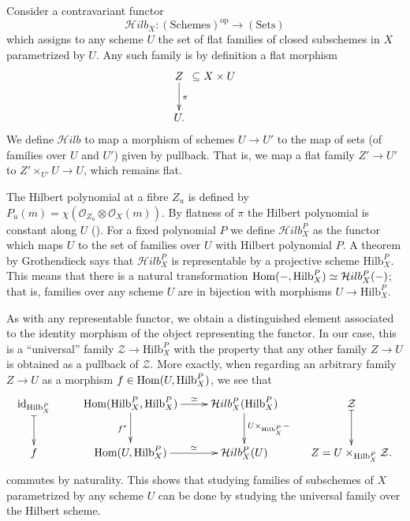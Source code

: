\medskip\noindent
Consider a contravariant functor 
$$
\mathcal{H}ilb_X:(\text{Schemes})^{\text{op}}\to (\text{Sets})
$$
which assigns to any scheme $U$ the set of flat families
of closed subschemes in $X$ parametrized by $U$.
Any such family is by definition a flat morphism
$$
\xymatrixcolsep{.1em}
\xymatrix{
Z \ar[d]^\pi&\subseteq X \times U\\
U.
}
$$
We define $\mathcal{H}ilb$ to map a morphism of schemes
$U \to U'$ to the map of sets (of families over $U$ and $U'$) given
by pullback. That is, we map a flat family $Z'\to U'$ 
to $Z'\times_{U'}U \to U$, which remains flat.

The Hilbert polynomial at a fibre $Z_u$ is defined by
$P_u(m)=\chi(\mathcal{O}_{Z_u}\otimes \mathcal{O}_X(m))$.
By flatness of $\pi$ the Hilbert polynomial is constant along $U$
(\cite[Part III, Theorem 9.9]{Hartshorne}).
For a fixed polynomial $P$
we define $\mathcal{H}ilb^P_X$ as the functor which maps $U$ 
to the set of families over $U$ with Hilbert polynomial $P$.
A theorem by Grothendieck says that $\mathcal{H}ilb^P_X$ is representable
by a projective scheme $\text{Hilb}^P_X$.
This means that there is a natural transformation
$\mathop{\mathrm{Hom}}\nolimits(-,\text{Hilb}^P_X) \simeq \mathcal{H}ilb^P_X(-)$;
that is, families over any scheme $U$ are in bijection with
morphisms $U \to \text{Hilb}^P_X$.

As with any representable functor,
we obtain a distinguished element associated to the identity morphism
of the object representing the functor.
In our case, this is a
``universal'' family $\mathcal{Z} \to \text{Hilb}^P_X$
with the property that any other family $Z \to U$ is obtained as a pullback
of $\mathcal{Z}$.
More exactly, when regarding an arbitrary family $Z \to U$ as a morphism
$f \in \mathop{\mathrm{Hom}}\nolimits(U,\text{Hilb}^P_X)$, we see that
$$
\xymatrix{
\text{id}_{\text{Hilb}^P_X}\ar@{|->}[d]
&\Hom(\text{Hilb}^P_X,\text{Hilb}^P_X)\ar[r]^-{\simeq}\ar[d]_{f^*}
&\mathcal{H}ilb^P_X(\text{Hilb}^P_X)\ar[d]^{U\times_{\text{Hilb}_X^P}-}
&\mathcal{Z}\ar@{|->}[d]\\
f&\Hom(U,\text{Hilb}^P_X)\ar[r]^-{\simeq}
 &\mathcal{H}ilb^P_X(U)& Z=U\times_{\text{Hilb}_X^P}\mathcal{Z}.
}
$$
commutes by naturality.
This shows that studying families of subschemes of $X$ parametrized by any
scheme $U$ can be done by studying the universal family
over the Hilbert scheme.

